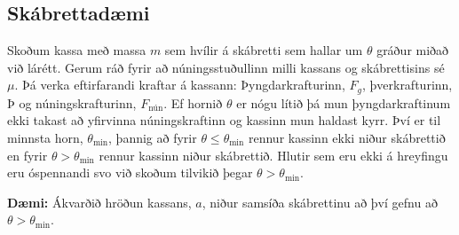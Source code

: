 \ifdefined \wholebook \else\documentclass[oneside]{book}\usepackage{EdlBook}\graphicspath{{figures/}}
\begin{document}
\subsection*{Skábrettadæmi}

Skoðum kassa með massa $m$ sem hvílir á skábretti sem hallar um $\theta$ gráður miðað við lárétt. Gerum ráð fyrir að núningsstuðullinn milli kassans og skábrettisins sé $\mu$. Þá verka eftirfarandi kraftar á kassann: Þyngdarkrafturinn, $F_g$, þverkrafturinn, $\text{Þ}$ og núningskrafturinn, $F_{\text{nún}}$. Ef hornið $\theta$ er nógu lítið þá mun þyngdarkraftinum ekki takast að yfirvinna núningskraftinn og kassinn mun haldast kyrr. Því er til minnsta horn, $\theta_{\text{min}}$, þannig að fyrir $\theta \leq \theta_{\text{min}}$ rennur kassinn ekki niður skábrettið en fyrir $\theta > \theta_{\text{min}}$ rennur kassinn niður skábrettið. Hlutir sem eru ekki á hreyfingu eru óspennandi svo við skoðum tilvikið þegar $\theta > \theta_{\text{min}}$.



\textbf{Dæmi:} Ákvarðið hröðun kassans, $a$, niður samsíða skábrettinu að því gefnu að $\theta > \theta_{\text{min}}$. \\
\end{document}
